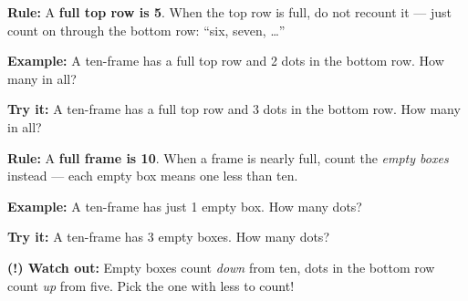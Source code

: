 \documentclass[12pt]{article}
\begin{document}


\begin{formulabox}
\textbf{Rule:} A \textbf{full top row is 5}. When the top row is full, do not
recount it --- just count on through the bottom row: ``six, seven, \ldots''
\end{formulabox}

\begin{examplebox}
\textbf{Example:} \quad A ten-frame has a full top row and 2 dots in the
bottom row. How many in all?
\end{examplebox}

\begin{tryitbox}
\textbf{Try it:} \quad A ten-frame has a full top row and 3 dots in the bottom
row. How many in all?\\[2pt]
\end{tryitbox}


\begin{formulabox}
\textbf{Rule:} A \textbf{full frame is 10}. When a frame is nearly full, count
the \emph{empty boxes} instead --- each empty box means one less than ten.
\end{formulabox}

\begin{examplebox}
\textbf{Example:} \quad A ten-frame has just 1 empty box. How many dots?
\end{examplebox}

\begin{tryitbox}
\textbf{Try it:} \quad A ten-frame has 3 empty boxes. How many dots?\\[2pt]
\end{tryitbox}

\begin{watchoutbox}
\textbf{(!) Watch out:} Empty boxes count \emph{down} from ten, dots in the
bottom row count \emph{up} from five. Pick the one with less to count!
\end{watchoutbox}
\end{document}
